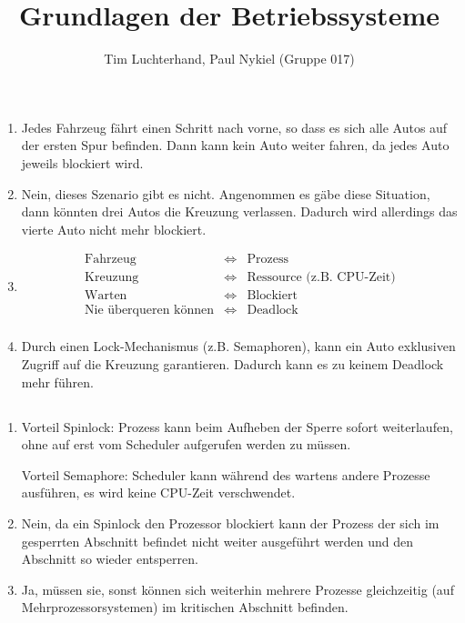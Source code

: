 \documentclass[DIN, pagenumber=false, fontsize=11pt, parskip=half]{scrartcl}
\title{Grundlagen der Betriebssysteme}
\author{Tim Luchterhand, Paul Nykiel (Gruppe 017)}
\begin{document}
    \maketitle
    \subsection{}
    \begin{enumerate}[label=(\alph*)]
        \item Jedes Fahrzeug fährt einen \glqq{}Schritt\grqq{} nach vorne, so dass es sich alle Autos auf der ersten Spur befinden.
            Dann kann kein Auto weiter fahren, da jedes Auto jeweils blockiert wird.
        \item Nein, dieses Szenario gibt es nicht. Angenommen es gäbe diese Situation, dann könnten drei Autos die Kreuzung verlassen. Dadurch wird allerdings das vierte Auto nicht mehr blockiert.
        \item 
            \begin{eqnarray*}
                \text{Fahrzeug} &\Leftrightarrow& \text{Prozess} \\
                \text{Kreuzung} &\Leftrightarrow& \text{Ressource (z.B. CPU-Zeit)} \\
                \text{Warten} &\Leftrightarrow& \text{Blockiert} \\
                \text{Nie überqueren können} &\Leftrightarrow& \text{Deadlock} \\
            \end{eqnarray*}
        \item Durch einen Lock-Mechanismus (z.B. Semaphoren), kann ein Auto exklusiven \glqq{}Zugriff\grqq{} auf die Kreuzung garantieren. Dadurch kann es zu keinem Deadlock mehr führen.
    \end{enumerate}
    \subsection{}
    \begin{enumerate}[label=(\alph*)]
        \item
            Vorteil Spinlock: Prozess kann beim Aufheben der Sperre sofort weiterlaufen, ohne auf erst vom Scheduler aufgerufen werden zu müssen.

            Vorteil Semaphore: Scheduler kann während des wartens andere Prozesse ausführen, es wird keine CPU-Zeit verschwendet.
        \item Nein, da ein Spinlock den Prozessor blockiert kann der Prozess der sich im gesperrten Abschnitt befindet nicht weiter ausgeführt werden und den Abschnitt so wieder entsperren.
        \item Ja, müssen sie, sonst können sich weiterhin mehrere Prozesse gleichzeitig (auf Mehrprozessorsystemen) im kritischen Abschnitt befinden.
    \end{enumerate}
\end{document}
